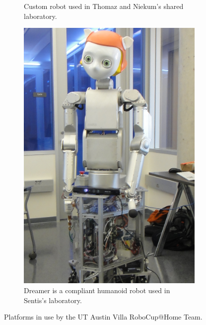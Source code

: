 \begin{figure}[t!]
\begin{subfigure}[t]{1.4in}
		\caption{Custom robot used in Thomaz and Niekum's shared laboratory.}\label{fig:1c}
	\end{subfigure}
	\quad
	\begin{subfigure}[t]{1.4in}
		\centering
        \includegraphics[width=\textwidth]{images/dreamer.png}
		\caption{Dreamer is a compliant humanoid robot used in Sentis's laboratory.}\label{fig:1d}
	\end{subfigure}
	\caption{Platforms in use by the UT Austin Villa RoboCup@Home Team.}\label{fig:1}
\end{figure}
